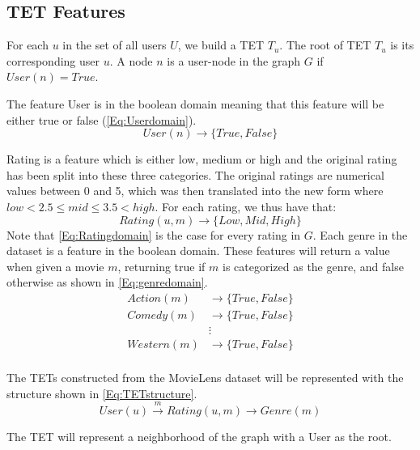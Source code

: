 \subsection{TET Features}\label{Subsec:TET_features}


For each $u$ in the set of all users $U$, we build a TET $T_u$. The root of TET $T_u$ is its corresponding user $u$.
A node $n$ is a user-node in the graph $G$ if $User(n) = True$.

The feature User is in the boolean domain meaning that this feature will be either true or false (\autoref{Eq:Userdomain}).
\begin{equation}\label{Eq:Userdomain}
  User(n)\rightarrow \{True, False\}
\end{equation}


Rating is a feature which is either low, medium or high and the original rating has been split into these three categories.
The original ratings are numerical values between 0 and 5, which was then translated into the new form where $low<2.5\leq mid \leq 3.5<high$.
For each rating, we thus have that:
\begin{equation}\label{Eq:Ratingdomain}
    Rating(u, m) \rightarrow \{Low, Mid, High\}
\end{equation}
Note that \autoref{Eq:Ratingdomain} is the case for every rating in $G$.
Each genre in the dataset is a feature in the boolean domain. These features will return a value when given a movie $m$, returning true if $m$ is categorized as the genre, and false otherwise as shown in \autoref{Eq:genredomain}.
\begin{equation}\label{Eq:genredomain}
\begin{aligned}
Action(m)& \rightarrow \{True, False\} \\
Comedy(m)& \rightarrow \{True, False\} \\
&\vdots \\
Western(m)& \rightarrow \{True, False\} \\
\end{aligned}
\end{equation}

The TETs constructed from the MovieLens dataset will be represented with the structure shown in \autoref{Eq:TETstructure}.
\begin{equation}\label{Eq:TETstructure}
User(u) \stackrel{m}{\longrightarrow} Rating(u,m) \longrightarrow Genre(m)
\end{equation}

The TET will represent a neighborhood of the graph with a User as the root.

